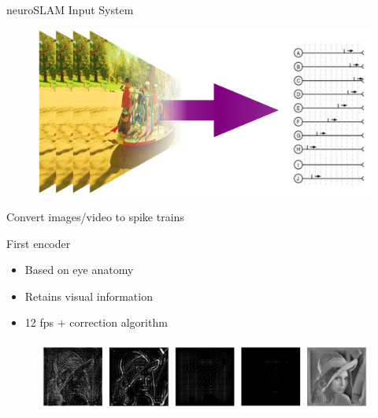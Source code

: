 \documentclass[17pt,mathserif]{beamer}
\begin{document}
        
    \begin{frame}{neuroSLAM Input System}
        \vspace*{-4em}
        \begin{figure}
            \includegraphics[scale=0.3]{./images-to-spikes}
        \end{figure}
        \vspace*{-0.4em}
        \hspace*{0.05\textwidth}
        \begin{minipage}{0.9\textwidth}
          \centering \small Convert images/video to spike trains
        \end{minipage}
    \end{frame}

    
    \begin{frame}{First encoder}
        \vspace*{-3em}
        \begin{itemize}
            \item Based on eye anatomy\cite{basab}
            \item Retains visual information
            \item 12 fps + correction algorithm
      \end{itemize}
      \vspace*{-1em}
      \begin{figure}
        \includegraphics[width=\textwidth]{focal-imgs}
      \end{figure}
    \end{frame}
\end{document}
